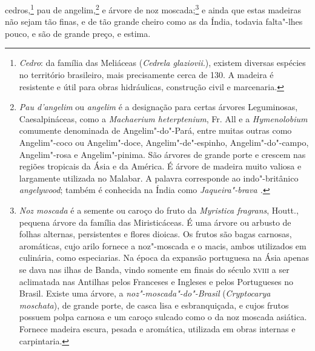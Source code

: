 \begin{linenumbers}
cedros,\footnote{ \textit{Cedro}: da família das Meliáceas 
(\textit{Cedrela glaziovii}.), existem diversas espécies no território
brasileiro, mais precisamente cerca de 130. A madeira é resistente e
útil para obras hidráulicas, construção civil e marcenaria.} pau de
angelim,\footnote{ \textit{Pau d'angelim} ou \textit{angelim} é a
designação para certas árvores Leguminosas, Caesalpináceas, como a 
\textit{Machaerium heterptenium}, Fr. All e a \textit{Hymenolobium} 
comumente denominada de Angelim"-do"-Pará, entre muitas outras como
Angelim"-coco ou Angelim"-doce, Angelim"-de"-espinho, Angelim"-do"-campo,
Angelim"-rosa e Angelim"-pinima. São árvores de grande porte e crescem
nas regiões tropicais da Ásia e da América. É árvore de madeira muito
valiosa e largamente utilizada no Malabar. A palavra corresponde ao
indo"-britânico \textit{angelywood}; também é conhecida na Índia como
\textit{Jaqueira"-brava .} } e árvore de noz moscada;\footnote{ \textit{Noz moscada} 
é a semente ou caroço do fruto da \textit{Myristica fragrans}, Houtt., pequena árvore da família das
Miristicáceas. É uma árvore ou arbusto de folhas alternas, persistentes
e flores dioicas. Os frutos são bagas carnosas, aromáticas, cujo arilo
fornece a noz"-moscada e o macis, ambos utilizados em culinária, como
especiarias. Na época da expansão portuguesa na Ásia apenas se dava nas
ilhas de Banda, vindo somente em finais do século \textsc{xviii} a ser
aclimatada nas Antilhas pelos Franceses e Ingleses e pelos Portugueses
no Brasil. Existe uma árvore, a \textit{noz"-moscada"-do"-Brasil} (\textit{Cryptocarya moschata}), 
de grande porte, de casca lisa e esbranquiçada,
e cujos frutos possuem polpa carnosa e um caroço sulcado como o da noz
moscada asiática. Fornece madeira escura, pesada e aromática, utilizada
em obras internas e carpintaria.} e ainda que estas madeiras não sejam
tão finas, e de tão grande cheiro como as da Índia, todavia falta"-lhes
pouco, e são de grande preço, e estima.


\end{linenumbers}
